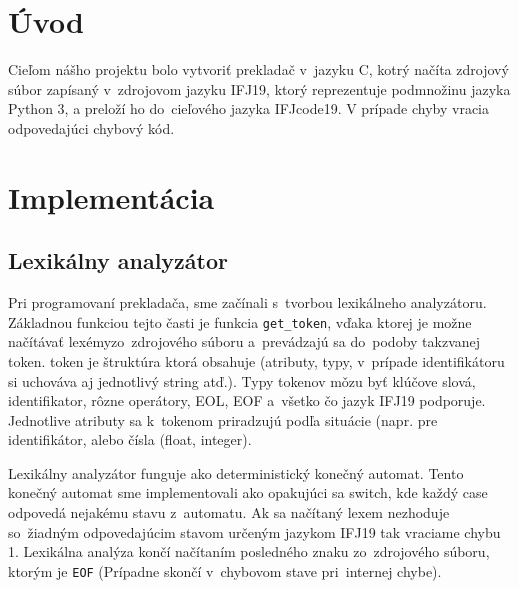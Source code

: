 \documentclass[a4paper, 11pt]{article}
\begin{document}
    \section{Úvod}
    Cieľom nášho projektu bolo vytvoriť prekladač v~jazyku C, kotrý načíta zdrojový súbor zapísaný v~zdrojovom jazyku IFJ19, ktorý reprezentuje podmnožinu jazyka Python 3, a preloží ho do~cieľového jazyka IFJcode19. V prípade chyby vracia odpovedajúci chybový kód.
    
    \section{Implementácia}
    
    \begin{figure}[h]
		\centering
	\end{figure}
    
    \subsection{Lexikálny analyzátor}

    Pri programovaní prekladača, sme začínali s~tvorbou lexikálneho analyzátoru. Základnou funkciou tejto časti je funkcia \texttt{get\_token}, vďaka ktorej je možne načítávať lexémy\footnotemark zo~zdrojového súboru a~prevádzajú sa do~podoby takzvanej token. token je štruktúra ktorá obsahuje (atributy, typy, v~prípade identifikátoru si uchováva aj jednotlivý string atď.). Typy tokenov mǒzu byť klúčove slová, identifikator, rôzne operátory, EOL, EOF a~všetko čo jazyk IFJ19 podporuje. Jednotlive atributy sa k~tokenom priradzujú podľa situácie (napr. pre identifikátor, alebo čísla (float, integer).
    
    Lexikálny analyzátor funguje ako deterministický konečný automat. Tento konečný automat sme implementovali ako opakujúci sa switch, kde každý case odpovedá nejakému stavu z~automatu. Ak sa načítaný lexem nezhoduje so~žiadným odpovedajúcim stavom určeným jazykom IFJ19 tak vraciame chybu 1. Lexikálna analýza končí načítaním posledného znaku zo~zdrojového súboru, ktorým je \texttt{EOF} (Prípadne skončí v~chybovom stave pri~internej chybe). 
\end{document}
